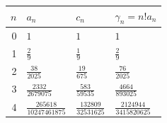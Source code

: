 \begin{tabular}{rlll}
\toprule
$n$ & $a_n$ & $c_n$ & $\gamma_n=n!a_n$ \\
\midrule
0 & $\displaystyle 1$ & $\displaystyle 1$ & $\displaystyle 1$ \\
1 & $\displaystyle \frac{2}{9}$ & $\displaystyle \frac{1}{9}$ & $\displaystyle \frac{2}{9}$ \\
2 & $\displaystyle \frac{38}{2025}$ & $\displaystyle \frac{19}{675}$ & $\displaystyle \frac{76}{2025}$ \\
3 & $\displaystyle \frac{2332}{2679075}$ & $\displaystyle \frac{583}{59535}$ & $\displaystyle \frac{4664}{893025}$ \\
4 & $\displaystyle \frac{265618}{10247461875}$ & $\displaystyle \frac{132809}{32531625}$ & $\displaystyle \frac{2124944}{3415820625}$ \\
\bottomrule
\end{tabular}
